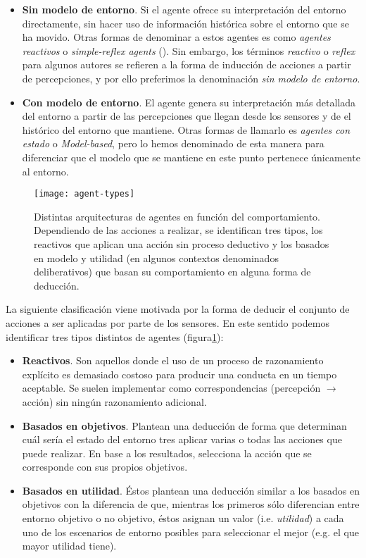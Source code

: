 \begin{itemize}
	\item \textbf{Sin modelo de entorno}. Si el agente ofrece su interpretación del entorno directamente, sin hacer uso de información histórica sobre el entorno que se ha movido. Otras formas de denominar a estos agentes es como \textit{agentes reactivos} o \textit{simple-reflex agents} (\cite{russell2003artificial}). Sin embargo, los términos \textit{reactivo} o \textit{reflex} para algunos autores se refieren a la forma de inducción de acciones a partir de percepciones, y por ello preferimos la denominación \textit{sin modelo de entorno}.
	\item \textbf{Con modelo de entorno}. El agente genera su interpretación más detallada del entorno a partir de las percepciones que llegan desde los sensores y de el histórico del entorno que mantiene. Otras formas de llamarlo es \textit{agentes con estado} o \textit{Model-based}, pero lo hemos denominado de esta manera para diferenciar que el modelo que se mantiene en este punto pertenece únicamente al entorno.
\end{itemize}

\begin{figure}
	\texttt{[image: agent-types]}
	\caption{Distintas arquitecturas de agentes en función del comportamiento. Dependiendo de las acciones a realizar, se identifican tres tipos, los reactivos que aplican una acción sin proceso deductivo y los basados en modelo y utilidad (en algunos contextos denominados deliberativos) que basan su comportamiento en alguna forma de deducción.}
	\label{fig:agent-types}
\end{figure}

La siguiente clasificación viene motivada por la forma de deducir el conjunto de acciones a ser aplicadas por parte de los sensores. En este sentido podemos identificar tres tipos distintos de agentes (figura\ref{fig:agent-types}):

\begin{itemize}
	\item \textbf{Reactivos}. Son aquellos donde el uso de un proceso de razonamiento explícito es demasiado costoso para producir una conducta en un tiempo aceptable. Se suelen implementar como correspondencias (percepción $\rightarrow$ acción) sin ningún razonamiento adicional.
	\item \textbf{Basados en objetivos}. Plantean una deducción de forma que determinan cuál sería el estado del entorno tres aplicar varias o todas las acciones que puede realizar. En base a los resultados, selecciona la acción que se corresponde con sus propios objetivos.
	\item \textbf{Basados en utilidad}. Éstos plantean una deducción similar a los basados en objetivos con la diferencia de que, mientras los primeros sólo diferencian entre entorno objetivo o no objetivo, éstos asignan un valor (i.e. \textit{utilidad}) a cada uno de los escenarios de entorno posibles para seleccionar el mejor (e.g. el que mayor utilidad tiene).
\end{itemize}

